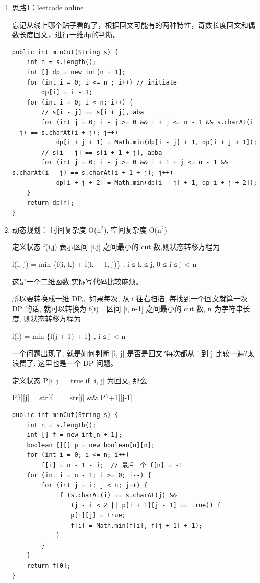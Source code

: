 \documentclass[12pt]{book}
\begin{document}
\begin{enumerate}
\item 思路1：leetcode online
\label{sec-14-3-6-1}

忘记从线上哪个贴子看的了，根据回文可能有的两种特性，奇数长度回文和偶数长度回文，进行一维dp的判断。
\lstset{language=java,label= ,caption= ,numbers=none}
\begin{lstlisting}
public int minCut(String s) {
    int n = s.length();
    int [] dp = new int[n + 1];
    for (int i = 0; i <= n ; i++) // initiate
        dp[i] = i - 1;
    for (int i = 0; i < n; i++) {
        // s[i - j] == s[i + j], aba
        for (int j = 0; i - j >= 0 && i + j <= n - 1 && s.charAt(i - j) == s.charAt(i + j); j++)
            dp[i + j + 1] = Math.min(dp[i - j] + 1, dp[i + j + 1]);
        // s[i - j] == s[i + 1 + j], abba
        for (int j = 0; i - j >= 0 && i + 1 + j <= n - 1 && s.charAt(i - j) == s.charAt(i + 1 + j); j++)
            dp[i + j + 2] = Math.min(dp[i - j] + 1, dp[i + j + 2]);
    }
    return dp[n];
}
\end{lstlisting}

\item 动态规划： 时间复杂度 O(n$^{\text{2}}$), 空间复杂度 O(n$^{\text{2}}$)
\label{sec-14-3-6-2}

定义状态 f(i,j) 表示区间 [i,j] 之间最小的 cut 数,则状态转移方程为

f(i, j) = min \{f(i, k) + f(k + 1, j)\} , i ≤ k ≤ j, 0 ≤ i ≤ j < n

这是一个二维函数,实际写代码比较麻烦。

所以要转换成一维 DP。如果每次, 从 i 往右扫描, 每找到一个回文就算一次DP 的话, 就可以转换为 f(i)= 区间 [i,  n-1] 之间最小的 cut 数, n 为字符串长度, 则状态转移方程为

f(i) = min \{f(j + 1) + 1\} ,  i ≤ j < n

一个问题出现了, 就是如何判断 [i, j] 是否是回文?每次都从 i 到 j 比较一遍?太浪费了, 这里也是一个 DP 问题。

定义状态 P[i][j] = true if [i, j] 为回文, 那么

P[i][j] = str[i] == str[j] \&\& P[i+1][j-1]

\lstset{language=java,label= ,caption= ,numbers=none}
\begin{lstlisting}
public int minCut(String s) {
    int n = s.length();
    int [] f = new int[n + 1];
    boolean [][] p = new boolean[n][n];
    for (int i = 0; i <= n; i++) 
        f[i] = n - 1 - i;  // 最后一个 f[n] = -1
    for (int i = n - 1; i >= 0; i--) {
        for (int j = i; j < n; j++) {
            if (s.charAt(i) == s.charAt(j) &&
                (j - i < 2 || p[i + 1][j - 1] == true)) {
                p[i][j] = true;
                f[i] = Math.min(f[i], f[j + 1] + 1);
            }
        }
    }
    return f[0];
}
\end{lstlisting}
\end{enumerate}
\end{document}
